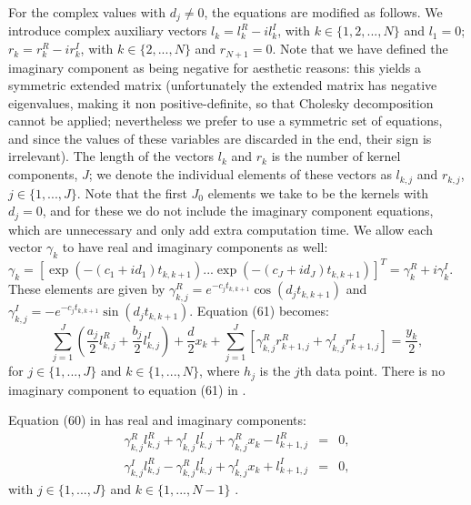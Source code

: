 \documentclass[manuscript, letterpaper]{aastex6}
\begin{document}
For the complex values with $d_j \ne 0$, the equations are modified as follows.  We introduce complex
auxiliary vectors $l_k = l_{k}^R - i l_{k}^I$, with $k \in \{1,2,...,N\}$ and $l_1 = 0$; $r_k =
r_k^R - i r_k^I$, with $k \in \{2,...,N\}$ and $r_{N+1} = 0$.  Note that we have defined the
imaginary component as being negative for aesthetic reasons:  this yields a symmetric extended
matrix (unfortunately the extended matrix has negative eigenvalues, making it non positive-definite,
so that Cholesky decomposition cannot be applied; nevertheless we prefer to use a symmetric
set of equations, and since the values of these variables are discarded in the end, their sign
is irrelevant).  The length of the vectors $l_k$ and $r_k$
is the number of kernel components, $J$;  we denote the individual elements of these vectors
as $l_{k,j}$ and $r_{k,j}$, $j \in \{1,...,J\}$.  Note that the first $J_0$ elements we take
to be the kernels with $d_j=0$, and for these we do not include the imaginary component
equations, which are unnecessary and only add extra computation time.  We allow each vector $\gamma_k$ to have real and imaginary
components as well:  $\gamma_k = \left[\exp{(-(c_1+id_1) t_{k,k+1})} ... \exp{(-(c_J+id_J) t_{k,k+1})}\right]^T
 = \gamma_k^R + i \gamma_k^I.$  These elements are given by $\gamma_{k,j}^R = e^{-c_j t_{k,k+1}}
\cos{(d_j t_{k,k+1})}$ and $\gamma_{k,j}^I = -e^{-c_j t_{k,k+1}}\sin{(d_j t_{k,k+1})}$.
Equation (61) becomes:
\begin{equation} \label{Amb61}
\sum_{j=1}^J \left(\frac{a_j}{2} l_{k,j}^R +\frac{b_j}{2} l_{k,j}^I\right)+ \frac{d}{2} x_k + \sum_{j=1}^J \left[
\gamma_{k,j}^R r_{k+1,j}^R + \gamma_{k,j}^I r_{k+1,j}^I\right] = \frac{y_k}{2},
\end{equation}
for $j \in \{1,...,J\}$ and $k \in \{1,...,N\}$, where $h_j$ is the $j$th data point.  There is no imaginary component to equation (61)
in \citet{Ambikasaran:2015}.

Equation (60) in \citet{Ambikasaran:2015} has real and imaginary components:
\begin{eqnarray} \label{Amb60}
\gamma_{k,j}^R l_{k,j}^R +\gamma_{k,j}^I l_{k,j}^I + \gamma_{k,j}^R x_k - l_{k+1,j}^R &=& 0,\\
\gamma_{k,j}^I l_{k,j}^R -\gamma_{k,j}^R l_{k,j}^I + \gamma_{k,j}^I x_k + l_{k+1,j}^I &=& 0,
\end{eqnarray}
with $j \in \{1,...,J\}$ and $k \in \{1,...,N-1\}$
\citep[note that we have shifted the indices of this equation by one from the indexing using in][]{Ambikasaran:2015}.
\end{document}
